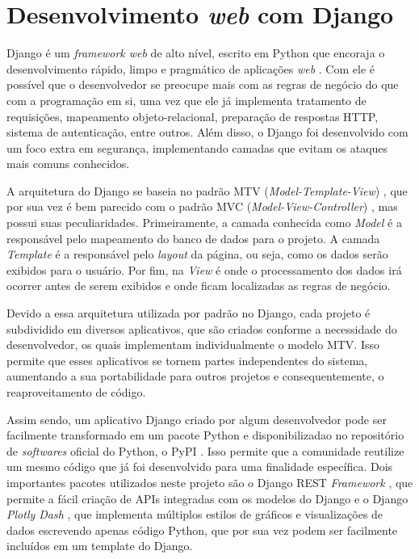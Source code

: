 \section{Desenvolvimento \textit{web} com Django}

\indent
\par Django é um \textit{framework web} de alto nível, escrito em Python que encoraja o desenvolvimento rápido, limpo e pragmático de aplicações \textit{web} \cite{Django}. Com ele é possível que o desenvolvedor se preocupe mais com as regras de negócio do que com a programação em si, uma vez que ele já implementa tratamento de requisições, mapeamento objeto-relacional, preparação de respostas HTTP, sistema de autenticação, entre outros. Além disso, o Django foi desenvolvido com um foco extra em segurança, implementando camadas que evitam os ataques mais comuns conhecidos.
\par A arquitetura do Django se baseia no padrão MTV (\textit{Model-Template-View}) \cite{MTV}, que por sua vez é bem parecido com o padrão MVC (\textit{Model-View-Controller}) \cite{MVC}, mas possui suas peculiaridades. Primeiramente, a camada conhecida como \textit{Model} é a responsável pelo mapeamento do banco de dados para o projeto. A camada \textit{Template} é a responsável pelo \textit{layout} da página, ou seja, como os dados serão exibidos para o usuário. Por fim, na \textit{View} é onde o processamento dos dados irá ocorrer antes de serem exibidos e onde ficam localizadas as regras de negócio.
\par Devido a essa arquitetura utilizada por padrão no Django, cada projeto é subdividido em diversos aplicativos, que são criados conforme a necessidade do desenvolvedor, os quais implementam individualmente o modelo MTV. Isso permite que esses aplicativos se tornem partes independentes do sistema, aumentando a sua portabilidade para outros projetos e consequentemente, o reaproveitamento de código.
\par Assim sendo, um aplicativo Django criado por algum desenvolvedor pode ser facilmente transformado em um pacote Python e disponibilizadao no repositório de \textit{softwares} oficial do Python, o PyPI \cite{PYPI}. Isso permite que a comunidade reutilize um mesmo código que já foi desenvolvido para uma finalidade específica. Dois importantes pacotes utilizados neste projeto são o Django REST \textit{Framework} \cite{DjangoRF}, que permite a fácil criação de APIs integradas com os modelos do Django e o Django \textit{Plotly Dash} \cite{DjangoPD}, que implementa múltiplos estilos de gráficos e visualizações de dados escrevendo apenas código Python, que por sua vez podem ser facilmente incluídos em um template do Django.

